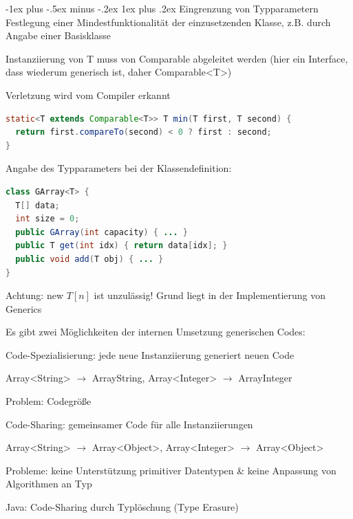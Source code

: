 \documentclass[10pt]{article}
\makeatletter
\renewcommand{\subsubsection}{\@startsection{subsubsection}{3}{0mm}%
                                {-1ex plus -.5ex minus -.2ex}%
                                {1ex plus .2ex}%
                                {\normalfont\small\bfseries}}
\makeatother
\begin{document}
\subsubsection{Eingrenzung von Typparametern}
Festlegung einer Mindestfunktionalität der einzusetzenden Klasse, z.B. durch Angabe einer Basisklasse
\begin{itemize*}
  \item Instanziierung von T muss von Comparable abgeleitet werden (hier ein Interface, dass wiederum generisch ist, daher Comparable<T>)
  \item Verletzung wird vom Compiler erkannt
\end{itemize*}
\begin{lstlisting}[language=java]
static<T extends Comparable<T>> T min(T first, T second) {
  return first.compareTo(second) < 0 ? first : second;
}
\end{lstlisting}

Angabe des Typparameters bei der Klassendefinition:
\begin{lstlisting}[language=java]
class GArray<T> {
  T[] data;
  int size = 0;
  public GArray(int capacity) { ... }
  public T get(int idx) { return data[idx]; }
  public void add(T obj) { ... }
}
\end{lstlisting}

Achtung: new $T[n]$ ist unzulässig! Grund liegt in der Implementierung von Generics

Es gibt zwei Möglichkeiten der internen Umsetzung generischen Codes:
\begin{itemize*}
  \item Code-Spezialisierung: jede neue Instanziierung generiert neuen Code
  \begin{itemize*}
    \item Array<String> $\rightarrow$ ArrayString, Array<Integer> $\rightarrow$ ArrayInteger
    \item Problem: Codegröße
  \end{itemize*}
  \item Code-Sharing: gemeinsamer Code für alle Instanziierungen
  \begin{itemize*}
    \item Array<String> $\rightarrow$ Array<Object>, Array<Integer> $\rightarrow$ Array<Object>
    \item Probleme: keine Unterstützung primitiver Datentypen \& keine Anpassung von Algorithmen an Typ
  \end{itemize*}
\end{itemize*}
Java: Code-Sharing durch Typlöschung (Type Erasure)
\end{document}
